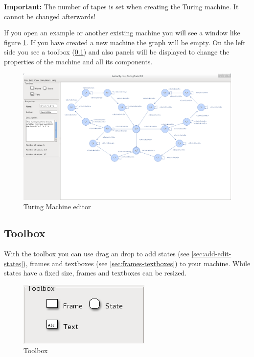 \documentclass[%
  a4paper,%
  11pt,%
  blue,%
  hyperref	%
  ]{tubsartcl}
\begin{document}
\textbf{Important:} The number of tapes is set when creating the Turing machine. It cannot be changed afterwards!

If you open an example or another existing machine you will see a window like figure \ref{pic:turing_editor}. If you have created a new machine the graph will be empty. On the left side you see a toolbox (\ref{sec:toolbox}) and also panels will be displayed to change the properties of the machine and all its components.
\begin{figure}[!htb]
\begin{center}
\includegraphics[scale=0.3]{graphics_gui/turing_editor.png}
\end{center}
\caption{Turing Machine editor}
\label{pic:turing_editor}
\end{figure}

\subsection{Toolbox}
\label{sec:toolbox}
With the toolbox you can use drag an drop to add states (see \ref{sec:add-edit-states}), frames and
textboxes (see \ref{sec:frames-textboxes}) to your machine. While states have a fixed size, frames and textboxes can be resized.
\begin{figure}[!htb]
\begin{center}
\includegraphics[scale=0.5]{graphics_gui/toolbox_turing.png}
\end{center}
\caption{Toolbox}
\label{pic:toolbox}
\end{figure}
\end{document}
